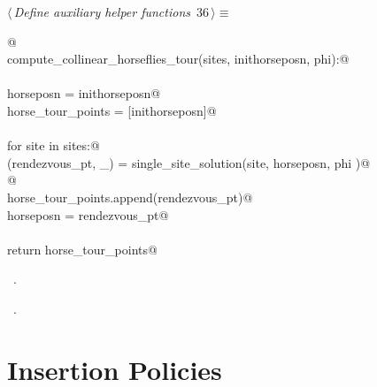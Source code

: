 \documentclass[11.5pt]{report}
\begin{document}
\begin{flushleft} \small
\begin{minipage}{\linewidth}\label{scrap31}\raggedright\small
{} $\langle\,${\itshape Define auxiliary helper functions}\nobreak\ {\footnotesize {36}}$\,\rangle\equiv$
\vspace{-1ex}
\begin{list}{}{} \item
\mbox{}\verb@   @\\
\mbox{}\verb@def compute_collinear_horseflies_tour(sites, inithorseposn, phi):@\\
\mbox{}\verb@@\\
\mbox{}\verb@      horseposn         = inithorseposn@\\
\mbox{}\verb@      horse_tour_points = [inithorseposn]@\\
\mbox{}\verb@@\\
\mbox{}\verb@      for site in sites:@\\
\mbox{}\verb@          (rendezvous_pt, _) = single_site_solution(site, horseposn, phi )@\\
\mbox{}\verb@            @\\
\mbox{}\verb@          horse_tour_points.append(rendezvous_pt)@\\
\mbox{}\verb@          horseposn = rendezvous_pt@\\
\mbox{}\verb@@\\
\mbox{}\verb@      return horse_tour_points@\\
\mbox{}\verb@@{\NWsep}
\end{list}
\vspace{-1.5ex}
\footnotesize
\begin{list}{}{\setlength{\itemsep}{-\parsep}\setlength{\itemindent}{-\leftmargin}}
\item \NWtxtMacroDefBy\ .
\item \NWtxtMacroRefIn\ .

\item{}
\end{list}
\end{minipage}\vspace{4ex}
\end{flushleft}
\section{Insertion Policies} 
\label{subsec:insertion-policies}
\end{document}
